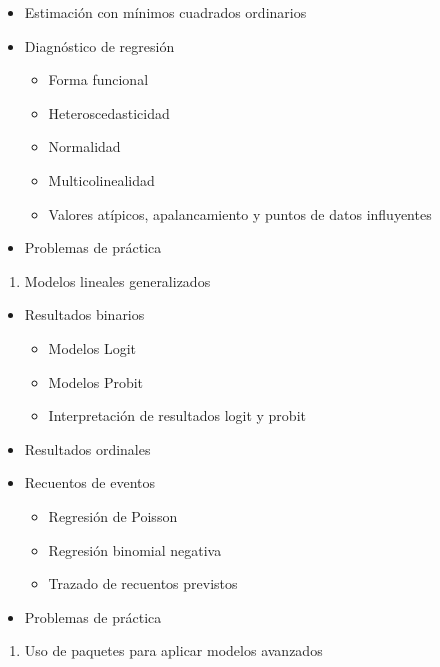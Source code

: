 \documentclass[
]{book}
\providecommand{\tightlist}{%
  \setlength{\itemsep}{0pt}\setlength{\parskip}{0pt}}
\begin{document}
\begin{itemize}
\tightlist
\item
  Estimación con mínimos cuadrados ordinarios
\item
  Diagnóstico de regresión

  \begin{itemize}
  \tightlist
  \item
    Forma funcional
  \item
    Heteroscedasticidad
  \item
    Normalidad
  \item
    Multicolinealidad
  \item
    Valores atípicos, apalancamiento y puntos de datos influyentes
  \end{itemize}
\item
  Problemas de práctica
\end{itemize}

\begin{enumerate}
\def\labelenumi{\arabic{enumi}.}
\setcounter{enumi}{6}
\tightlist
\item
  Modelos lineales generalizados
\end{enumerate}

\begin{itemize}
\tightlist
\item
  Resultados binarios

  \begin{itemize}
  \tightlist
  \item
    Modelos Logit
  \item
    Modelos Probit
  \item
    Interpretación de resultados logit y probit
  \end{itemize}
\item
  Resultados ordinales
\item
  Recuentos de eventos

  \begin{itemize}
  \tightlist
  \item
    Regresión de Poisson
  \item
    Regresión binomial negativa
  \item
    Trazado de recuentos previstos
  \end{itemize}
\item
  Problemas de práctica
\end{itemize}

\begin{enumerate}
\def\labelenumi{\arabic{enumi}.}
\setcounter{enumi}{7}
\tightlist
\item
  Uso de paquetes para aplicar modelos avanzados
\end{enumerate}
\end{document}
